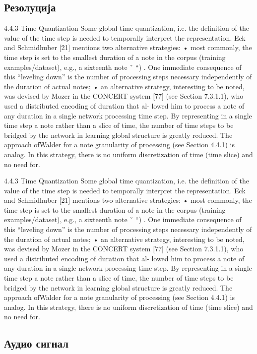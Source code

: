 \subsection{Резолуција}
4.4.3 Time Quantization
Some global time quantization, i.e. the definition of the value of the time step is needed to temporally interpret the representation. Eck and Schmidhuber [21] mentions two alternative strategies:
• most commonly, the time step is set to the smallest duration of a note in the corpus
(training examples/dataset), e.g., a sixteenth note ˇ “) . One immediate consequence of this “leveling down” is the number of processing steps necessary independently of the duration of actual notes;
• an alternative strategy, interesting to be noted, was devised by Mozer in the CONCERT system [77] (see Section 7.3.1.1), who used a distributed encoding of duration that al-
lowed him to process a note of any duration in a single network processing time step. By representing in a single time step a note rather than a slice of time, the number of time steps to be bridged by the network in learning global structure is greatly reduced. The approach ofWalder for a note granularity of processing (see Section 4.4.1) is analog. In this strategy, there is no uniform discretization of time (time slice) and no need for.

4.4.3 Time Quantization
Some global time quantization, i.e. the definition of the value of the time step is needed to temporally interpret the representation. Eck and Schmidhuber [21] mentions two alternative strategies:
• most commonly, the time step is set to the smallest duration of a note in the corpus
(training examples/dataset), e.g., a sixteenth note ˇ “) . One immediate consequence of this “leveling down” is the number of processing steps necessary independently of the duration of actual notes;
• an alternative strategy, interesting to be noted, was devised by Mozer in the CONCERT system [77] (see Section 7.3.1.1), who used a distributed encoding of duration that al-
lowed him to process a note of any duration in a single network processing time step. By representing in a single time step a note rather than a slice of time, the number of time steps to be bridged by the network in learning global structure is greatly reduced. The approach ofWalder for a note granularity of processing (see Section 4.4.1) is analog. In this strategy, there is no uniform discretization of time (time slice) and no need for.

\subsection{Аудио сигнал}

